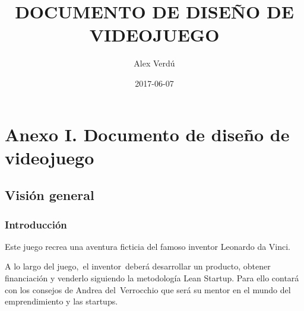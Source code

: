 \setlength\footskip{0.0cm}
\setlength\headheight{0cm}
\setlength\headsep{0cm}
\setlength{\skip\footins}{1.1777999mm}
\renewcommand\footnoterule{\vspace*{-0.007in}\setlength\leftskip{0pt}\setlength\rightskip{0pt plus 1fil}\noindent\textcolor{black}{\rule{0.33\columnwidth}{0.007in}}\vspace*{1mm}}
\makeatletter
\newcommand\ps@MP{
  \renewcommand\@oddhead{}
  \renewcommand\@evenhead{}
  \renewcommand\@oddfoot{}
  \renewcommand\@evenfoot{}
  \renewcommand\thepage{\arabic{page}}
}
\newcommand\ps@MPF{
  \renewcommand\@oddhead{}
  \renewcommand\@evenhead{}
  \renewcommand\@oddfoot{}
  \renewcommand\@evenfoot{}
  \renewcommand\thepage{\arabic{page}}
}
\makeatother
\pagestyle{MP}
\title{DOCUMENTO DE DISE\~NO DE VIDEOJUEGO}
\author{Alex Verd\'u}
\date{2017-06-07}
%
\chapter{Anexo I. Documento de diseño de videojuego}
\label{GDD}

%


\clearpage\clearpage\setcounter{page}{1}\pagestyle{MP}
\thispagestyle{MPF}

\clearpage
\bigskip

\section[]{ }
\section[Visi\'on general]{ Visi\'on general}
\hypertarget{Toc484614208}{}\subsection[Introducci\'on]{ Introducci\'on}
\hypertarget{Toc484614209}{}{
Este juego recrea una aventura ficticia del famoso inventor Leonardo da Vinci.\ }

{
A lo largo del juego,\ el inventor\ deber\'a desarrollar un producto, obtener financiaci\'on y venderlo siguiendo la
metodolog\'ia Lean Startup. Para ello contar\'a con los consejos de Andrea del\ Verrocchio que ser\'a su mentor en el
mundo del emprendimiento y las startups.}

